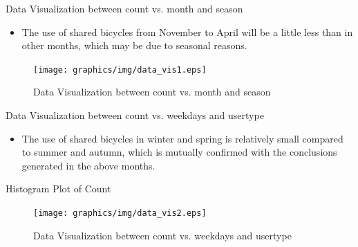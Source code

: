 \documentclass[
 size=14pt,
 paper=smartboard,  %
 mode=present, 		%
 display=slides, 	%
 style=tuliplab,  	%
 pauseslide,
 fleqn,leqno]{powerdot}
\begin{document}
  \begin{slide}[toc=,bm=]{ Data Visualization between count vs. month and season }

    \begin{itemize}
    \item The use of shared bicycles from November to April will be a little less than in other months, which may be due to seasonal reasons. 
    \end{itemize}
  
    \begin{figure}
      \centering
      \centerline{\texttt{[image: graphics/img/data\_vis1.eps]}}
      \caption{Data Visualization between count vs. month and season}\label{fig:Data Visualization between count vs. month and season}
    \end{figure}
    \end{slide}
    \begin{slide}[toc=,bm=]{ Data Visualization between count vs. weekdays and usertype }

      \begin{itemize}
      \item The use of shared bicycles in winter and spring is relatively small compared to summer and autumn, which is mutually confirmed with the conclusions generated in the above months.
      \end{itemize}
      Histogram Plot of Count
      \begin{figure}
        \centering
        \centerline{\texttt{[image: graphics/img/data\_vis2.eps]}}
        \caption{Data Visualization between count vs. weekdays and usertype}\label{fig:Data Visualization between count vs. weekdays and usertype}
      \end{figure}
      \end{slide}
\end{document}
